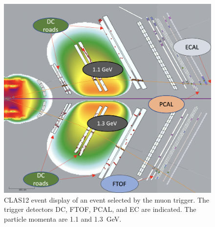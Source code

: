 \begin{figure}[!htb]
 	\centering
  	\includegraphics[width=0.95\columnwidth,keepaspectratio]{img/Muon_trigger.png}
 	\caption{CLAS12 event display of an event selected by the muon trigger. The trigger detectors DC, FTOF,
          PCAL, and EC are indicated. The particle momenta are 1.1 and 1.3~GeV.}
	\label{fig:muon}
\end{figure}
\noindent



